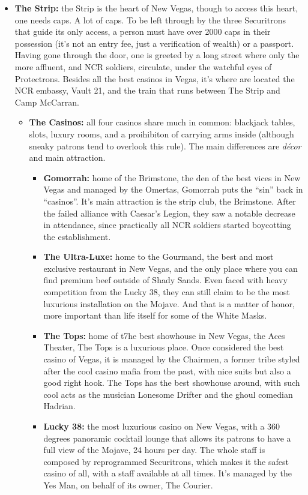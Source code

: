 \documentclass[11pt]{article} %
\begin{document}
\begin{itemize}
\item \textbf{The Strip:} the Strip is the heart of New Vegas, though to access this heart, one needs caps. A lot of caps. To be left through by the three Securitrons that guide its only access, a person must have over 2000 caps in their possession (it's not an entry fee, just a verification of wealth) or a passport. Having gone through the door, one is greeted by a long street where only the more affluent, and NCR soldiers, circulate, under the watchful eyes of Protectrons. Besides all the best casinos in Vegas, it's where are located the NCR embassy, Vault 21, and the train that runs between The Strip and Camp McCarran. 
	\begin{itemize}
	\item \textbf{The Casinos:} all four casinos share much in common: blackjack tables, slots, luxury rooms, and a proihibiton of carrying arms inside (although sneaky patrons tend to overlook this rule). The main differences are \textit{décor} and main attraction. 
		\begin{itemize}
		\item \textbf{Gomorrah:} home of the Brimstone, the den of the best vices in New Vegas and managed by the Omertas, Gomorrah puts the ``sin'' back in ``casinos''. It's main attraction is the strip club, the Brimstone. After the failed alliance with Caesar's Legion, they saw a notable decrease in attendance, since practically all NCR soldiers started boycotting the establishment.
		\item \textbf{The Ultra-Luxe:} home to the Gourmand, the best and most exclusive restaurant in New Vegas, and the only place where you can find premium beef outside of Shady Sands. Even faced with heavy competition from the Lucky 38, they can still claim to be the most luxurious installation on the Mojave. And that is a matter of honor, more important than life itself for some of the White Masks.
		\item \textbf{The Tops:} home of t7he best showhouse in New Vegas, the Aces Theater, The Tops is a luxurious place. Once considered the best casino of Vegas, it is managed by the Chairmen, a former tribe styled after the cool casino mafia from the past, with nice suits but also a good right hook. The Tops has the best showhouse around, with such cool acts as the musician Lonesome Drifter and the ghoul comedian Hadrian.
		\item \textbf{Lucky 38:} the most luxurious casino on New Vegas, with a 360 degrees panoramic cocktail lounge that allows its patrons to have a full view of the Mojave, 24 hours per day. The whole staff is composed by reprogrammed Securitrons, which makes it the safest casino of all, with a staff available at all times. It's managed by the Yes Man, on behalf of its owner, The Courier.
		\end{itemize}
	\end{itemize}


\end{itemize}
\end{document}
